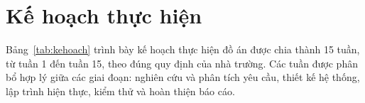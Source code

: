 \documentclass[a4paper,12pt]{extreport}
\begin{document}
\newpage
\pagestyle{frontmatter} 
\nocite{*} 

\begin{otherlanguage}{english}
    \printbibheading[heading=centeredheading]
    
    \printbibliography[keyword=viet, heading=subbibliography, title={Tài liệu tiếng Việt}, resetnumbers=false]
    \printbibliography[keyword=english, heading=subbibliography, title={Tài liệu Tiếng Anh}, resetnumbers=false]
    \printbibliography[keyword=internet, heading=subbibliography, title={Các tài liệu từ Internet}, resetnumbers=false]
\end{otherlanguage}

\newpage
\pagestyle{frontmatter}
\appendix
\renewcommand{\thechapter}{\arabic{chapter}}
\setcounter{chapter}{0}
\renewcommand{\chaptername}{Phụ lục}

\chapter{Kế hoạch thực hiện}
\label{app:kehoach}

Bảng~\ref{tab:kehoach} trình bày kế hoạch thực hiện đồ án được chia thành 15 tuần, từ tuần 1 đến tuần 15, theo đúng quy định của nhà trường. Các tuần được phân bổ hợp lý giữa các giai đoạn: nghiên cứu và phân tích yêu cầu, thiết kế hệ thống, lập trình hiện thực, kiểm thử và hoàn thiện báo cáo.
\end{document}
